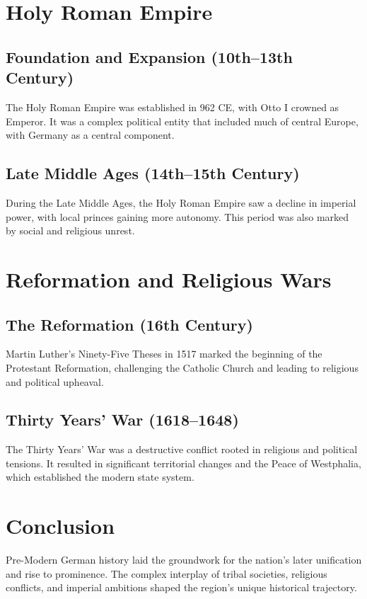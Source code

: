 \documentclass[a4paper,12pt]{book}
\begin{document}
\section{Holy Roman Empire}
\label{sec:holy-roman-empire}
\subsection{Foundation and Expansion (10th–13th Century)}
The Holy Roman Empire was established in 962 CE, with Otto I crowned as Emperor. It was a complex political entity that included much of central Europe, with Germany as a central component.

\subsection{Late Middle Ages (14th–15th Century)}
During the Late Middle Ages, the Holy Roman Empire saw a decline in imperial power, with local princes gaining more autonomy. This period was also marked by social and religious unrest.

\section{Reformation and Religious Wars}
\label{sec:reformation-religious-wars}
\subsection{The Reformation (16th Century)}
Martin Luther’s Ninety-Five Theses in 1517 marked the beginning of the Protestant Reformation, challenging the Catholic Church and leading to religious and political upheaval.

\subsection{Thirty Years’ War (1618–1648)}
The Thirty Years’ War was a destructive conflict rooted in religious and political tensions. It resulted in significant territorial changes and the Peace of Westphalia, which established the modern state system.

\section{Conclusion}
\label{sec:conclusion-pre-modern-germany}
Pre-Modern German history laid the groundwork for the nation’s later unification and rise to prominence. The complex interplay of tribal societies, religious conflicts, and imperial ambitions shaped the region’s unique historical trajectory.
\end{document}
